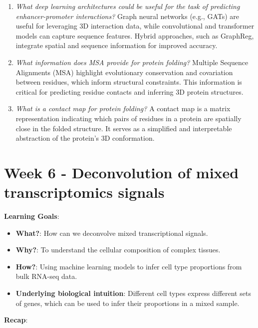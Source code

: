\documentclass[a4paper]{article}
\begin{document}
\begin{enumerate}
    \item \textit{What deep learning architectures could be useful for the task of predicting enhancer-promoter interactions?}  
    Graph neural networks (e.g., GATs) are useful for leveraging 3D interaction data, while convolutional and transformer models can capture sequence features.  
    Hybrid approaches, such as GraphReg, integrate spatial and sequence information for improved accuracy.  

    \item \textit{What information does MSA provide for protein folding?}  
    Multiple Sequence Alignments (MSA) highlight evolutionary conservation and covariation between residues, which inform structural constraints.  
    This information is critical for predicting residue contacts and inferring 3D protein structures.  

    \item \textit{What is a contact map for protein folding?}  
    A contact map is a matrix representation indicating which pairs of residues in a protein are spatially close in the folded structure.  
    It serves as a simplified and interpretable abstraction of the protein's 3D conformation.  
\end{enumerate}

\newpage

\section*{Week 6 - Deconvolution of mixed transcriptomics signals}

\textbf{Learning Goals}:  

\begin{itemize}
  \item \textbf{What?}: How can we deconvolve mixed transcriptional signals.  
  \item \textbf{Why?}: To understand the cellular composition of complex tissues.  
  \item \textbf{How?}: Using machine learning models to infer cell type proportions from bulk RNA-seq data.
  \item \textbf{Underlying biological intuition}: Different cell types express different sets of genes, which can be used to infer their proportions in a mixed sample.
\end{itemize}

\textbf{Recap}:
\end{document}
